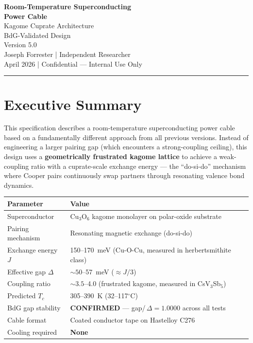 \documentclass[11pt, a4paper]{article}
\begin{document}
\begin{center}
  {\LARGE \textbf{Room-Temperature Superconducting}}\\[4pt]
  {\LARGE \textbf{Power Cable}}\\[6pt]
  {\large Kagome Cuprate Architecture}\\[4pt]
  {\large BdG-Validated Design}\\[10pt]
  {\color{nm-gray}\small Version 5.0}\\[4pt]
  {\color{nm-gray}\small Joseph Forrester \quad|\quad
    Independent Researcher}\\[4pt]
  {\color{nm-gray}\small April 2026 \quad|\quad
    Confidential --- Internal Use Only}
\end{center}

\vspace{1em}\hrule\vspace{1em}

\section*{Executive Summary}

This specification describes a room-temperature superconducting
power cable based on a fundamentally different approach from all
previous versions. Instead of engineering a larger pairing gap
(which encounters a strong-coupling ceiling), this design uses a
\textbf{geometrically frustrated kagome lattice} to achieve a
weak-coupling ratio with a cuprate-scale exchange energy ---
the ``do-si-do'' mechanism where Cooper pairs continuously swap
partners through resonating valence bond dynamics.

\begin{center}
\begin{tabular}{@{}ll@{}}
\toprule
\textbf{Parameter} & \textbf{Value} \\
\midrule
Superconductor & Cu$_3$O$_6$ kagome monolayer on polar-oxide
  substrate \\
Pairing mechanism & Resonating magnetic exchange (do-si-do) \\
Exchange energy $J$ & 150--170~meV (Cu-O-Cu, measured in
  herbertsmithite class) \\
Effective gap $\Delta$ & $\sim 50$--57~meV ($\approx J/3$) \\
Coupling ratio & $\sim 3.5$--4.0 (frustrated kagome, measured in
  CsV$_3$Sb$_5$) \\
Predicted $T_c$ & 305--390~K (32--117$^\circ$C) \\
BdG gap stability & \textcolor{nm-green}{\textbf{CONFIRMED}}
  --- gap/\,$\Delta = 1.0000$ across all tests \\
Cable format & Coated conductor tape on Hastelloy C276 \\
Cooling required & \textbf{None} \\
\bottomrule
\end{tabular}
\end{center}
\end{document}
